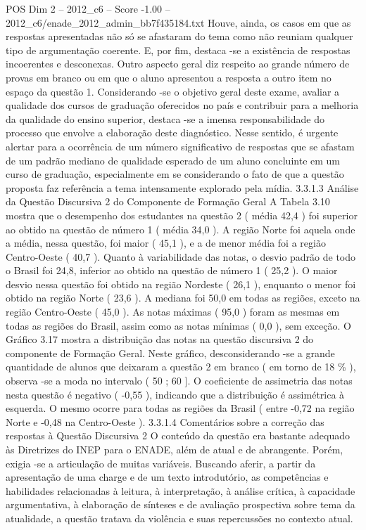\begin{textsample}{POS Dim 2 – 2012\_c6 – Score -1.00 – 2012\_c6/enade\_2012\_admin\_bb7f435184.txt}
Houve, ainda, os casos em que as respostas apresentadas não só se afastaram do tema como não reuniam qualquer tipo de argumentação coerente.
E, por fim, destaca -se a existência de respostas incoerentes e desconexas.
Outro aspecto geral diz respeito ao grande número de provas em branco ou em que o aluno apresentou a resposta a outro item no espaço da questão 1.
Considerando -se o objetivo geral deste exame, avaliar a qualidade dos cursos de graduação oferecidos no país e contribuir para a melhoria da qualidade do ensino superior, destaca -se a imensa responsabilidade do processo que envolve a elaboração deste diagnóstico.
Nesse sentido, é urgente alertar para a ocorrência de um número significativo de respostas que se afastam de um padrão mediano de qualidade esperado de um aluno concluinte em um curso de graduação, especialmente em se considerando o fato de que a questão proposta faz referência a tema intensamente explorado pela mídia. 3.3.1.3 Análise da Questão Discursiva 2 do Componente de Formação Geral A Tabela 3.10 mostra que o desempenho dos estudantes na questão 2 ( média 42,4 ) foi superior ao obtido na questão de número 1 ( média 34,0 ).
A região Norte foi aquela onde a média, nessa questão, foi maior ( 45,1 ), e a de menor média foi a região Centro-Oeste ( 40,7 ).
Quanto à variabilidade das notas, o desvio padrão de todo o Brasil foi 24,8, inferior ao obtido na questão de número 1 ( 25,2 ).
O maior desvio nessa questão foi obtido na região Nordeste ( 26,1 ), enquanto o menor foi obtido na região Norte ( 23,6 ).
A mediana foi 50,0 em todas as regiões, exceto na região Centro-Oeste ( 45,0 ).
As notas máximas ( 95,0 ) foram as mesmas em todas as regiões do Brasil, assim como as notas mínimas ( 0,0 ), sem exceção.
O Gráfico 3.17 mostra a distribuição das notas na questão discursiva 2 do componente de Formação Geral.
Neste gráfico, desconsiderando -se a grande quantidade de alunos que deixaram a questão 2 em branco ( em torno de 18 \% ), observa -se a moda no intervalo ( 50 ; 60 ].
O coeficiente de assimetria das notas nesta questão é negativo ( -0,55 ), indicando que a distribuição é assimétrica à esquerda.
O mesmo ocorre para todas as regiões da Brasil ( entre -0,72 na região Norte e -0,48 na Centro-Oeste ). 3.3.1.4 Comentários sobre a correção das respostas à Questão Discursiva 2 O conteúdo da questão era bastante adequado às Diretrizes do INEP para o ENADE, além de atual e de abrangente.
Porém, exigia -se a articulação de muitas variáveis.
Buscando aferir, a partir da apresentação de uma charge e de um texto introdutório, as competências e habilidades relacionadas à leitura, à interpretação, à análise crítica, à capacidade argumentativa, à elaboração de sínteses e de avaliação prospectiva sobre tema da atualidade, a questão tratava da violência e suas repercussões no contexto atual.

\end{textsample}
